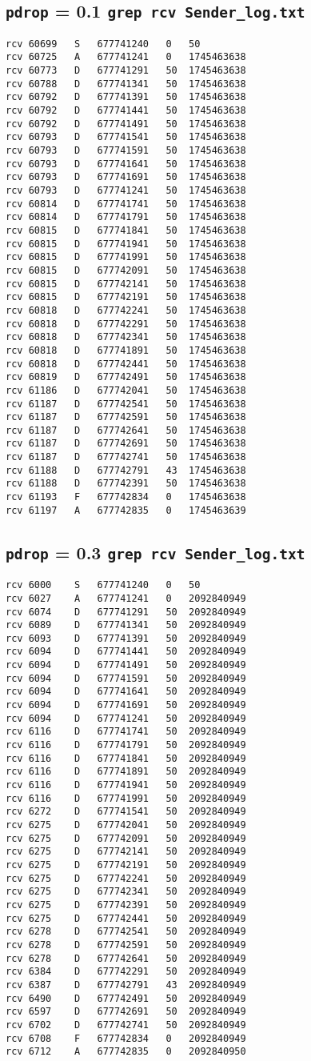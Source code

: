 \documentclass[a4paper]{article}
\begin{document}
\subsection {\texttt{pdrop} = 0.1 \texttt{grep rcv Sender\_log.txt}}
\begin{lstlisting}
rcv	60699	S	677741240	0	50
rcv	60725	A	677741241	0	1745463638
rcv	60773	D	677741291	50	1745463638
rcv	60788	D	677741341	50	1745463638
rcv	60792	D	677741391	50	1745463638
rcv	60792	D	677741441	50	1745463638
rcv	60792	D	677741491	50	1745463638
rcv	60793	D	677741541	50	1745463638
rcv	60793	D	677741591	50	1745463638
rcv	60793	D	677741641	50	1745463638
rcv	60793	D	677741691	50	1745463638
rcv	60793	D	677741241	50	1745463638
rcv	60814	D	677741741	50	1745463638
rcv	60814	D	677741791	50	1745463638
rcv	60815	D	677741841	50	1745463638
rcv	60815	D	677741941	50	1745463638
rcv	60815	D	677741991	50	1745463638
rcv	60815	D	677742091	50	1745463638
rcv	60815	D	677742141	50	1745463638
rcv	60815	D	677742191	50	1745463638
rcv	60818	D	677742241	50	1745463638
rcv	60818	D	677742291	50	1745463638
rcv	60818	D	677742341	50	1745463638
rcv	60818	D	677741891	50	1745463638
rcv	60818	D	677742441	50	1745463638
rcv	60819	D	677742491	50	1745463638
rcv	61186	D	677742041	50	1745463638
rcv	61187	D	677742541	50	1745463638
rcv	61187	D	677742591	50	1745463638
rcv	61187	D	677742641	50	1745463638
rcv	61187	D	677742691	50	1745463638
rcv	61187	D	677742741	50	1745463638
rcv	61188	D	677742791	43	1745463638
rcv	61188	D	677742391	50	1745463638
rcv	61193	F	677742834	0	1745463638
rcv	61197	A	677742835	0	1745463639
\end{lstlisting}

\subsection {\texttt{pdrop} = 0.3 \texttt{grep rcv Sender\_log.txt}}
\begin{lstlisting}
rcv	6000	S	677741240	0	50
rcv	6027	A	677741241	0	2092840949
rcv	6074	D	677741291	50	2092840949
rcv	6089	D	677741341	50	2092840949
rcv	6093	D	677741391	50	2092840949
rcv	6094	D	677741441	50	2092840949
rcv	6094	D	677741491	50	2092840949
rcv	6094	D	677741591	50	2092840949
rcv	6094	D	677741641	50	2092840949
rcv	6094	D	677741691	50	2092840949
rcv	6094	D	677741241	50	2092840949
rcv	6116	D	677741741	50	2092840949
rcv	6116	D	677741791	50	2092840949
rcv	6116	D	677741841	50	2092840949
rcv	6116	D	677741891	50	2092840949
rcv	6116	D	677741941	50	2092840949
rcv	6116	D	677741991	50	2092840949
rcv	6272	D	677741541	50	2092840949
rcv	6275	D	677742041	50	2092840949
rcv	6275	D	677742091	50	2092840949
rcv	6275	D	677742141	50	2092840949
rcv	6275	D	677742191	50	2092840949
rcv	6275	D	677742241	50	2092840949
rcv	6275	D	677742341	50	2092840949
rcv	6275	D	677742391	50	2092840949
rcv	6275	D	677742441	50	2092840949
rcv	6278	D	677742541	50	2092840949
rcv	6278	D	677742591	50	2092840949
rcv	6278	D	677742641	50	2092840949
rcv	6384	D	677742291	50	2092840949
rcv	6387	D	677742791	43	2092840949
rcv	6490	D	677742491	50	2092840949
rcv	6597	D	677742691	50	2092840949
rcv	6702	D	677742741	50	2092840949
rcv	6708	F	677742834	0	2092840949
rcv	6712	A	677742835	0	2092840950
\end{lstlisting}
\end{document}
